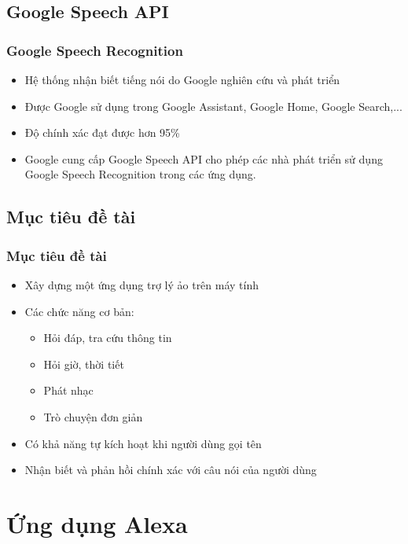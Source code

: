 \documentclass{beamer}
\begin{document}
\subsection{Google Speech API}
\begin{frame}
\frametitle{Google Speech Recognition}
\begin{itemize}
\item Hệ thống nhận biết tiếng nói do Google nghiên cứu và phát triển
\item Được Google sử dụng trong Google Assistant, Google Home, Google Search,...
\item Độ chính xác đạt được hơn 95\%
\item Google cung cấp Google Speech API cho phép các nhà phát triển sử dụng Google Speech Recognition trong các ứng dụng.
\end{itemize}
\end{frame}

\subsection{Mục tiêu đề tài}

\begin{frame}
\frametitle{Mục tiêu đề tài}
\begin{itemize}
\item Xây dựng một ứng dụng trợ lý ảo trên máy tính
\item Các chức năng cơ bản:
    \begin{itemize}
    \item Hỏi đáp, tra cứu thông tin
    \item Hỏi giờ, thời tiết
    \item Phát nhạc
    \item Trò chuyện đơn giản
    \end{itemize}
\item Có khả năng tự kích hoạt khi người dùng gọi tên
\item Nhận biết và phản hồi chính xác với câu nói của người dùng
\end{itemize}
\end{frame}

\section{Ứng dụng Alexa}
\end{document}
